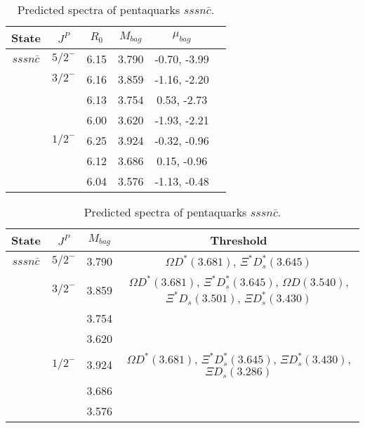 \documentclass[prd,twocolumn,floatfix,nofootinbib]{revtex4}
\begin{document}
\renewcommand{\tabcolsep}{0.5cm}
\renewcommand{\arraystretch}{1.2}
\begin{table*}[!htbp]
    \caption{Predicted spectra of pentaquarks $sssn\bar{c}$.}
    \begin{tabular}{cccccc}
        \hline\hline
        {\rm State} &$J^{P}$ &$R_{0}$ &$M_{bag}$ &$\mu_{bag}$  \\ \hline
        $sssn\bar{c}$
            &${5/2}^{-}$    &6.15   &3.790  &-0.70, -3.99     \\
            &${3/2}^{-}$    &6.16   &3.859  &-1.16, -2.20  \\
            &               &6.13   &3.754  &0.53, -2.73  \\
            &               &6.00   &3.620  &-1.93, -2.21  \\
            &${1/2}^{-}$    &6.25   &3.924  &-0.32, -0.96  \\
            &               &6.12   &3.686  &0.15, -0.96  \\
            &               &6.04   &3.576  &-1.13, -0.48  \\
        \hline\hline
    \end{tabular}
\end{table*}

\renewcommand{\tabcolsep}{0.5cm}
\renewcommand{\arraystretch}{1.2}
\begin{table*}[!htbp]
    \caption{Predicted spectra of pentaquarks $sssn\bar{c}$.}
    \begin{tabular}{cccc}
        \hline\hline
        {\rm State} &$J^{P}$ &$M_{bag}$ &{\rm Threshold} \\ \hline
        $sssn\bar{c}$
            &${5/2}^{-}$    &3.790 &$\Omega D^{\ast}(3.681)$, $\Xi^{\ast} D^{\ast}_{s}(3.645)$ \\
            &${3/2}^{-}$    &3.859 &$\Omega D^{\ast}(3.681)$, $\Xi^{\ast} D^{\ast}_{s}(3.645)$, $\Omega D(3.540)$, $\Xi^{\ast} D_{s}(3.501)$, $\Xi D^{\ast}_{s}(3.430)$ \\
            &               &3.754 & \\
            &               &3.620 & \\
            &${1/2}^{-}$    &3.924 &$\Omega D^{\ast}(3.681)$, $\Xi^{\ast} D^{\ast}_{s}(3.645)$, $\Xi D^{\ast}_{s}(3.430)$, $\Xi D_{s}(3.286)$ \\
            &               &3.686 & \\
            &               &3.576 & \\
        \hline\hline
    \end{tabular}
\end{table*}
\end{document}
